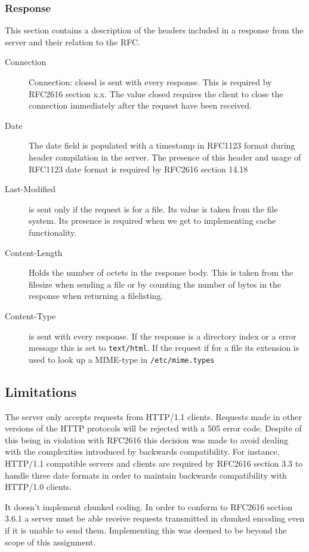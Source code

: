 \documentclass{sig-alternate}
\begin{document}
\subsubsection{Response}

This section contains a description of the headers included in a
response from the server and their relation to the RFC.

\begin{description}
\item[Connection] Connection: closed is sent with every response. This
  is required by RFC2616 section x.x. The value closed requires the
  client to close the connection immediately after the request have
  been received.
\item[Date] The date field is populated with a timestamp in RFC1123
  format during header compilation in the server. The presence of this
  header and usage of RFC1123 date format is required by RFC2616
  section 14.18
\item[Last-Modified] is sent only if the request is for a file. Its
  value is taken from the file system. Its presence is required when
  we get to implementing cache functionality.
\item[Content-Length] Holds the number of octets in the response
  body. This is taken from the filesize when sending a file or by
  counting the number of bytes in the response when returning a
  filelisting.
\item[Content-Type] is sent with every response. If the response is a
  directory index or a error message this is set to
  \verb!text/html!. If the request if for a file its extension is used
  to look up a MIME-type in \verb!/etc/mime.types!

\end{description}

\subsection{Limitations}
The server only accepts requests from HTTP/1.1 clients. Requests made
in other versions of the HTTP protocols will be rejected with a 505
error code. Despite of this being in violation with RFC2616 this
decision was made to avoid dealing with the complexities introduced by
backwards compatibility. For instance, HTTP/1.1 compatible servers and
clients are required by RFC2616 section 3.3 to handle three date
formats in order to maintain backwards compatibility with HTTP/1.0
clients.

It doesn't implement chunked coding. In order to conform to RFC2616
section 3.6.1 a server must be able receive requests transmitted in
chunked encoding even if it is unable to send them. Implementing this
was deemed to be beyond the scope of this assignment.
\end{document}
